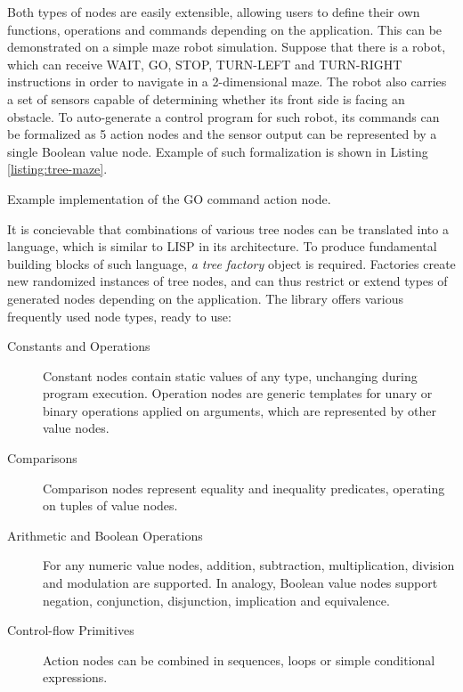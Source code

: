 Both types of nodes are easily extensible, allowing users to define their own functions, operations and commands depending on the application. This can be demonstrated on a simple maze robot simulation. Suppose that there is a robot, which can receive WAIT, GO, STOP, TURN-LEFT and TURN-RIGHT instructions in order to navigate in a 2-dimensional maze. The robot also carries a set of sensors capable of determining whether its front side is facing an obstacle. To auto-generate a control program for such robot, its commands can be formalized as 5 action nodes and the sensor output can be represented by a single Boolean value node. Example of such formalization is shown in Listing \ref{listing:tree-maze}.

\begin{listing}[ht]
	\caption{Example implementation of the GO command action node.}
	\label{listing:tree-maze}
\end{listing}

It is concievable that combinations of various tree nodes can be translated into a language, which is similar to LISP in its architecture. To produce fundamental building blocks of such language, \textit{a tree factory} object is required. Factories create new randomized instances of tree nodes, and can thus restrict or extend types of generated nodes depending on the application. The library offers various frequently used node types, ready to use:
~
\begin{description}
	\item[Constants and Operations]
	Constant nodes contain static values of any type, unchanging during program execution. Operation nodes are generic templates for unary or binary operations applied on arguments, which are represented by other value nodes.

	\item[Comparisons]
	Comparison nodes represent equality and inequality predicates, operating on tuples of value nodes.

	\item[Arithmetic and Boolean Operations]
	For any numeric value nodes, addition, subtraction, multiplication, division and modulation are supported. In analogy, Boolean value nodes support negation, conjunction, disjunction, implication and equivalence.

	\item[Control-flow Primitives]
	Action nodes can be combined in sequences, loops or simple conditional expressions.
\end{description}

